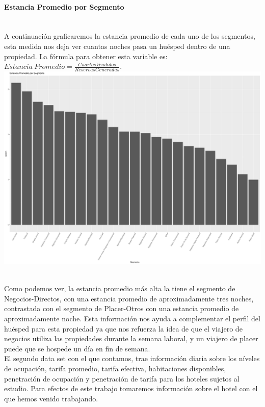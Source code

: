 \documentclass{article}\usepackage[]{graphicx}\usepackage[]{color}
\makeatletter
\def\maxwidth{ %
  \ifdim\Gin@nat@width>\linewidth
    \linewidth
  \else
    \Gin@nat@width
  \fi
}
\newenvironment{knitrout}{}{} %
\makeatother
\begin{document}
\paragraph{Estancia Promedio por Segmento} ~\\
A continuación graficaremos la estancia promedio de cada uno de los segmentos, esta medida nos deja ver cuantas noches pasa un huésped dentro de una propiedad. La fórmula para obtener esta variable es: $ Estancia\ Promedio=\frac{Cuartos Vendidos}{Reservas Generadas}$.
~\\
\begin{knitrout}
\color{fgcolor}
\includegraphics[width=\maxwidth]{figures/EstanciaPromedio-1} 

\end{knitrout}
~\\
Como podemos ver, la estancia promedio más alta la tiene el segmento de Negocios-Directos, con una estancia promedio de aproximadamente tres noches, contrastada con el segmento de Placer-Otros con una estancia promedio de aproximadamente noche. Esta información nos ayuda a complementar el perfil del huésped para esta propiedad ya que nos refuerza la idea de que el viajero de negocios utiliza las propiedades durante la semana laboral, y un viajero de placer puede que se hospede un día en fin de semana.
~\\
El segundo data set con el que contamos, trae información diaria sobre los níveles de ocupación, tarifa promedio, tarifa efectiva, habitaciones disponibles, penetración de ocupación y penetración de tarifa para los hoteles sujetos al estudio. Para efectos de este trabajo tomaremos información sobre el hotel con el que hemos venido trabajando.
\end{document}
